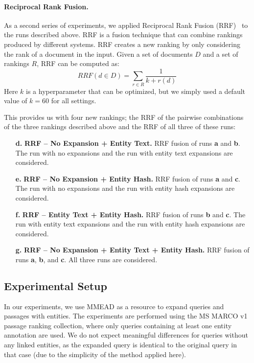 \paragraph{Reciprocal Rank Fusion.} As a second series of experiments, we applied Reciprocal Rank Fusion (RRF)~\citep{10.1145/1571941.1572114} to the runs described above. RRF is a fusion technique that can combine rankings produced by different systems. RRF creates a new ranking by only considering the rank of a document in the input. Given a set of documents $D$ and a set of rankings $R$, RRF can be computed as: 
\begin{equation}
	RRF(d \in D) = \sum_{r\in R}\frac{1}{k + r(d)}
\end{equation}
Here $k$ is a hyperparameter that can be optimized, but we simply used a default value of $k=60$ for all settings.

This provides us with four new rankings; the RRF of the pairwise combinations of the three rankings described above and the RRF of all three of these runs:
\begin{itemize}
	\item[\textbf{d.}] \textbf{RRF -- No Expansion + Entity Text.} RRF fusion of runs \textbf{a} and \textbf{b}. The run with no expansions and the run with entity text expansions are considered.
	\item[\textbf{e.}] \textbf{RRF -- No Expansion + Entity Hash.} RRF fusion of runs \textbf{a} and \textbf{c}. The run with no expansions and the run with entity hash expansions are considered.
	\item[\textbf{f.}] \textbf{RRF -- Entity Text + Entity Hash.}  RRF fusion of runs \textbf{b} and \textbf{c}. The run with entity text expansions and the run with entity hash expansions are considered.
	\item[\textbf{g.}] \textbf{RRF -- No Expansion + Entity Text + Entity Hash.} RRF fusion of runs \textbf{a}, \textbf{b}, and \textbf{c}. All three runs are considered. 
\end{itemize}

\subsection{Experimental Setup}

In our experiments, we use MMEAD as a resource to expand queries and passages with entities. The experiments are performed using the MS MARCO v1 passage ranking collection, where only queries containing at least one entity annotation are used. We do not expect meaningful differences for queries without any linked entities, as the expanded query is identical to the original query in that case (due to the simplicity of the method applied here). 

